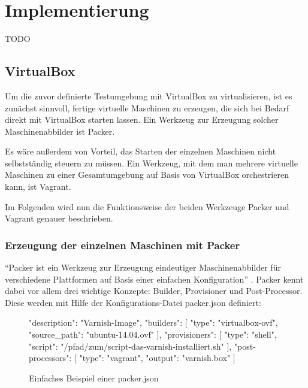 \section{Implementierung}

TODO

\subsection{VirtualBox}

Um die zuvor definierte Testumgebung mit VirtualBox zu virtualisieren, ist es zunächst sinnvoll, fertige virtuelle Maschinen zu erzeugen, die sich bei Bedarf direkt mit VirtualBox starten lassen. Ein Werkzeug zur Erzeugung solcher Maschinenabbilder ist Packer.

Es wäre außerdem von Vorteil, das Starten der einzelnen Maschinen nicht selbstständig steuern zu müssen. Ein Werkzeug, mit dem man mehrere virtuelle Maschinen zu einer Gesamtumgebung auf Basis von VirtualBox orchestrieren kann, ist Vagrant.

Im Folgenden wird nun die Funktionsweise der beiden Werkzeuge Packer und Vagrant genauer beschrieben.

\subsubsection{Erzeugung der einzelnen Maschinen mit Packer}

"`Packer ist ein Werkzeug zur Erzeugung eindeutiger Maschinenabbilder für verschiedene Plattformen auf Basis einer einfachen Konfiguration"' \citep[Siehe][]{Packer15}. Packer kennt dabei vor allem drei wichtige Konzepte: Builder, Provisioner und Post-Processor. Diese werden mit Hilfe der Konfigurations-Datei packer.json definiert:

\begin{figure}[!ht]
  \begin{center}
    \begin{jsoncode}
{
    "description": "Varnish-Image",
    "builders": [
        {
            "type": "virtualbox-ovf",
            "source_path": "ubuntu-14.04.ovf"
        }
    ],
    "provisioners": [
        {
            "type": "shell",
            "script": "/pfad/zum/script-das-varnish-installiert.sh"
        }
    ],
    "post-processors": [
        {
            "type": "vagrant",
            "output": "varnish.box"
        }
    ]
}
    \end{jsoncode}
    \caption{Einfaches Beispiel einer packer.json}
  \end{center}
\end{figure}

